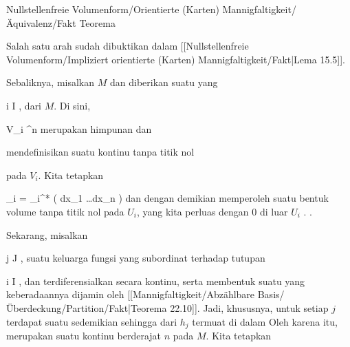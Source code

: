 {Nullstellenfreie Volumenform/Orientierte (Karten) Mannigfaltigkeit/Äquivalenz/Fakt}
{Teorema}
{}
{

\faktzusatz {}

}
{

\teilbeweis {}{}{}
{Salah satu arah sudah dibuktikan
dalam [[Nullstellenfreie Volumenform/Impliziert orientierte (Karten) Mannigfaltigkeit/Fakt|Lema 15.5]].}
{}
\teilbeweis {}{}{}
{Sebaliknya, misalkan $M$
dan diberikan suatu
yang

 {}
 {i \in I} {}
 {} {} {} {,}
dari $M$. Di sini,

\mavergleichskette
{\vergleichskette
{ V_i
}
{ \subseteq }{ \R^n
}
{  }{
}
{    }{
}
{   }{
}
}
{}{}{}
merupakan himpunan
dan

 mendefinisikan suatu
kontinu tanpa titik nol
 {} {}

 pada $V_i$. Kita tetapkan

\mavergleichskettedisp
{\vergleichskette
{ \omega_i
}
{ =} { \alpha_i^* \left( dx_1 \wedge \ldots \wedge dx_n \right)
}
{ } {
}
{ } {
}
{ } {
}
}
{}{}{}
dan dengan demikian memperoleh suatu bentuk volume tanpa titik nol pada $U_i$, yang kita perluas dengan $0$ di luar $U_i$ {.} {.}

Sekarang, misalkan

 {}
 {j \in J} {}
 {} {} {} {,}
suatu keluarga fungsi yang subordinat terhadap tutupan

 {}
 {i \in I} {}
 {} {} {} {,}
dan terdiferensialkan secara kontinu, serta membentuk suatu
yang keberadaannya dijamin oleh
[[Mannigfaltigkeit/Abzählbare Basis/Überdeckung/Partition/Fakt|Teorema 22.10]].
Jadi, khususnya, untuk setiap $j$ terdapat suatu
 sedemikian sehingga
dari $h_j$ termuat di dalam
Oleh karena itu,
 merupakan suatu
kontinu berderajat $n$ pada $M$. Kita tetapkan

}}
